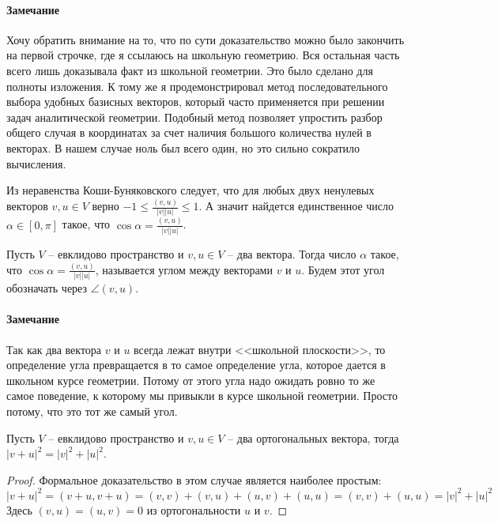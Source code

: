 \paragraph{Замечание} 

Хочу обратить внимание на то, что по сути доказательство можно было закончить на первой строчке, где я ссылаюсь  на школьную геометрию.
Вся остальная часть всего лишь доказывала факт из школьной геометрии.
Это было сделано для полноты изложения.
К тому же я продемонстрировал метод последовательного выбора удобных базисных векторов, который часто применяется при решении задач аналитической геометрии.
Подобный метод позволяет упростить разбор общего случая в координатах за счет наличия большого количества нулей в векторах.
В нашем случае ноль был всего один, но это сильно сократило вычисления.

Из неравенства Коши-Буняковского следует, что для любых двух ненулевых векторов $v,u\in V$ верно $-1\leqslant \frac{(v,u)}{|v| |u|}\leqslant 1$.
А значит найдется единственное число $\alpha\in [0,\pi]$ такое, что $\cos \alpha = \frac{(v,u)}{|v| |u|}$.

\begin{definition}
Пусть $V$ -- евклидово пространство и $v,u\in V$ -- два вектора.
Тогда число $\alpha$ такое, что $\cos \alpha = \frac{(v,u)}{|v| |u|}$, называется углом между векторами $v$ и $u$.
Будем этот угол обозначать через $\angle(v, u)$.
\end{definition}

\paragraph{Замечание}

Так как два вектора $v$ и $u$ всегда лежат внутри <<школьной плоскости>>, то определение угла превращается в то самое определение угла, которое дается в школьном курсе геометрии.
Потому от этого угла надо ожидать ровно то же самое поведение, к которому мы привыкли в курсе школьной геометрии.
Просто потому, что это тот же самый угол.

\begin{claim}
\label{claim::Pythagoras}
Пусть $V$ -- евклидово пространство и $v,u\in V$ -- два ортогональных вектора, тогда $|v + u|^2 = |v|^2 + |u|^2$.
\end{claim}
\begin{proof}
Формальное доказательство в этом случае является наиболее простым:
\[
|v+u|^2 = (v+u, v+u) = (v,v) + (v,u)+(u,v) +(u,u) = (v,v) + (u,u) = |v|^2 + |u|^2
\]
Здесь $(v,u)=(u,v) = 0$ из ортогональности $u$ и $v$.
\end{proof}

